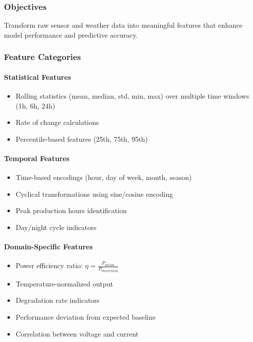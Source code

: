 \documentclass[12pt,a4paper]{article}
\begin{document}
\subsubsection{Objectives}
Transform raw sensor and weather data into meaningful features that enhance model performance and predictive accuracy.

\subsubsection{Feature Categories}

\paragraph{Statistical Features}
\begin{itemize}[leftmargin=*]
    \item Rolling statistics (mean, median, std, min, max) over multiple time windows (1h, 6h, 24h)
    \item Rate of change calculations
    \item Percentile-based features (25th, 75th, 95th)
\end{itemize}

\paragraph{Temporal Features}
\begin{itemize}[leftmargin=*]
    \item Time-based encodings (hour, day of week, month, season)
    \item Cyclical transformations using sine/cosine encoding
    \item Peak production hours identification
    \item Day/night cycle indicators
\end{itemize}

\paragraph{Domain-Specific Features}
\begin{itemize}[leftmargin=*]
    \item Power efficiency ratio: $\eta = \frac{P_{actual}}{P_{theoretical}}$
    \item Temperature-normalized output
    \item Degradation rate indicators
    \item Performance deviation from expected baseline
    \item Correlation between voltage and current
\end{itemize}
\end{document}
